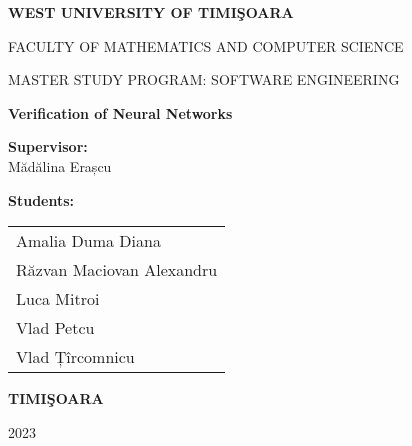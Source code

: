 \documentclass[12pt,a4paper,oneside]{book}
\theoremstyle{definition}
\theoremstyle{remark}
\begin{document}
\sloppy

\thispagestyle{empty}

\newpage
\thispagestyle{empty}
\begin{center}
{\large{\bf WEST UNIVERSITY OF TIMI\c SOARA
		
FACULTY OF MATHEMATICS AND COMPUTER SCIENCE
		
MASTER STUDY PROGRAM:  SOFTWARE ENGINEERING}}

\vspace{200pt}
{\huge {\bf Verification of Neural Networks }}

\vspace{153pt}
\end{center}

\noindent
\begin{minipage}[t]{0.45\textwidth}
    \textbf{Supervisor:} \\
    Mădălina Erașcu \\
\end{minipage}%
\hfill
\begin{minipage}[t]{0.35\textwidth}
    \textbf{Students:} \\
    \begin{tabular}[t]{l}
        Amalia Duma Diana \\
        Răzvan Maciovan Alexandru \\
        Luca Mitroi \\
        Vlad Petcu \\
        Vlad Țîrcomnicu \\
    \end{tabular}
\end{minipage}

 

\vfill
\begin{center}
{\bf TIMI\c SOARA

2023}
\end{center}


\tableofcontents


\end{document}
